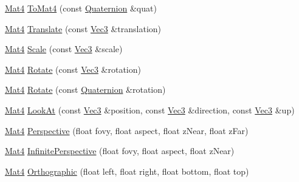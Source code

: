 \begin{DoxyCompactItemize}
\item 
\hyperlink{namespace_g_f_w_1_1_math_a313d630ab7d0ef3b109bb39401962fb1}{Mat4} \hyperlink{namespace_g_f_w_1_1_math_a96067ac21170d0dc012478d488f90b40}{To\+Mat4} (const \hyperlink{namespace_g_f_w_1_1_math_ae0c2a9f7efcd94286b950a2ddea66ee0}{Quaternion} \&quat)
\item 
\hyperlink{namespace_g_f_w_1_1_math_a313d630ab7d0ef3b109bb39401962fb1}{Mat4} \hyperlink{namespace_g_f_w_1_1_math_a0fb2d1e12d551d092219848e551516f1}{Translate} (const \hyperlink{namespace_g_f_w_1_1_math_a3c3a254de27c8bbb8434611ce231c378}{Vec3} \&translation)
\item 
\hyperlink{namespace_g_f_w_1_1_math_a313d630ab7d0ef3b109bb39401962fb1}{Mat4} \hyperlink{namespace_g_f_w_1_1_math_a791e7e88a9b79ebb06e1947dbc4008eb}{Scale} (const \hyperlink{namespace_g_f_w_1_1_math_a3c3a254de27c8bbb8434611ce231c378}{Vec3} \&scale)
\item 
\hyperlink{namespace_g_f_w_1_1_math_a313d630ab7d0ef3b109bb39401962fb1}{Mat4} \hyperlink{namespace_g_f_w_1_1_math_a346f4e2d64a4fcd1e6c755e68752fb97}{Rotate} (const \hyperlink{namespace_g_f_w_1_1_math_a3c3a254de27c8bbb8434611ce231c378}{Vec3} \&rotation)
\item 
\hyperlink{namespace_g_f_w_1_1_math_a313d630ab7d0ef3b109bb39401962fb1}{Mat4} \hyperlink{namespace_g_f_w_1_1_math_ae545c0df907ca279e8783f9c7d2e083e}{Rotate} (const \hyperlink{namespace_g_f_w_1_1_math_ae0c2a9f7efcd94286b950a2ddea66ee0}{Quaternion} \&rotation)
\item 
\hyperlink{namespace_g_f_w_1_1_math_a313d630ab7d0ef3b109bb39401962fb1}{Mat4} \hyperlink{namespace_g_f_w_1_1_math_a049c747ba5e17c0b0cd66f68ea1001d7}{Look\+At} (const \hyperlink{namespace_g_f_w_1_1_math_a3c3a254de27c8bbb8434611ce231c378}{Vec3} \&position, const \hyperlink{namespace_g_f_w_1_1_math_a3c3a254de27c8bbb8434611ce231c378}{Vec3} \&direction, const \hyperlink{namespace_g_f_w_1_1_math_a3c3a254de27c8bbb8434611ce231c378}{Vec3} \&up)
\item 
\hyperlink{namespace_g_f_w_1_1_math_a313d630ab7d0ef3b109bb39401962fb1}{Mat4} \hyperlink{namespace_g_f_w_1_1_math_acd834e439cef29d3b31dacd50120d201}{Perspective} (float fovy, float aspect, float z\+Near, float z\+Far)
\item 
\hyperlink{namespace_g_f_w_1_1_math_a313d630ab7d0ef3b109bb39401962fb1}{Mat4} \hyperlink{namespace_g_f_w_1_1_math_a36e265c2385dd13be0e5692da5fc2773}{Infinite\+Perspective} (float fovy, float aspect, float z\+Near)
\item 
\hyperlink{namespace_g_f_w_1_1_math_a313d630ab7d0ef3b109bb39401962fb1}{Mat4} \hyperlink{namespace_g_f_w_1_1_math_a0dadedc2357d44473ec33b38d5457f00}{Orthographic} (float left, float right, float bottom, float top)
\end{DoxyCompactItemize}


